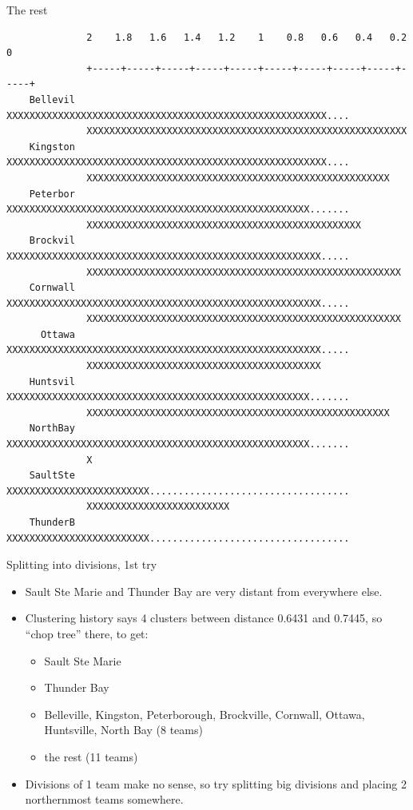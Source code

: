 \documentclass[pdf]{prosper}
\begin{document}
\begin{slide}{The rest}
{\tiny
\begin{verbatim}
              2    1.8   1.6   1.4   1.2    1    0.8   0.6   0.4   0.2    0
              +-----+-----+-----+-----+-----+-----+-----+-----+-----+-----+
    Bellevil  XXXXXXXXXXXXXXXXXXXXXXXXXXXXXXXXXXXXXXXXXXXXXXXXXXXXXXXX....
              XXXXXXXXXXXXXXXXXXXXXXXXXXXXXXXXXXXXXXXXXXXXXXXXXXXXXXXX
    Kingston  XXXXXXXXXXXXXXXXXXXXXXXXXXXXXXXXXXXXXXXXXXXXXXXXXXXXXXXX....
              XXXXXXXXXXXXXXXXXXXXXXXXXXXXXXXXXXXXXXXXXXXXXXXXXXXXX
    Peterbor  XXXXXXXXXXXXXXXXXXXXXXXXXXXXXXXXXXXXXXXXXXXXXXXXXXXXX.......
              XXXXXXXXXXXXXXXXXXXXXXXXXXXXXXXXXXXXXXXXXXXXXXXX
    Brockvil  XXXXXXXXXXXXXXXXXXXXXXXXXXXXXXXXXXXXXXXXXXXXXXXXXXXXXXX.....
              XXXXXXXXXXXXXXXXXXXXXXXXXXXXXXXXXXXXXXXXXXXXXXXXXXXXXXX
    Cornwall  XXXXXXXXXXXXXXXXXXXXXXXXXXXXXXXXXXXXXXXXXXXXXXXXXXXXXXX.....
              XXXXXXXXXXXXXXXXXXXXXXXXXXXXXXXXXXXXXXXXXXXXXXXXXXXXXXX
      Ottawa  XXXXXXXXXXXXXXXXXXXXXXXXXXXXXXXXXXXXXXXXXXXXXXXXXXXXXXX.....
              XXXXXXXXXXXXXXXXXXXXXXXXXXXXXXXXXXXXXXXXX
    Huntsvil  XXXXXXXXXXXXXXXXXXXXXXXXXXXXXXXXXXXXXXXXXXXXXXXXXXXXX.......
              XXXXXXXXXXXXXXXXXXXXXXXXXXXXXXXXXXXXXXXXXXXXXXXXXXXXX
    NorthBay  XXXXXXXXXXXXXXXXXXXXXXXXXXXXXXXXXXXXXXXXXXXXXXXXXXXXX.......
              X
    SaultSte  XXXXXXXXXXXXXXXXXXXXXXXXX...................................
              XXXXXXXXXXXXXXXXXXXXXXXXX
    ThunderB  XXXXXXXXXXXXXXXXXXXXXXXXX...................................

\end{verbatim}
}
  
\end{slide}

\begin{slide}{Splitting into divisions, 1st try}

  \begin{itemize}
  \item Sault Ste Marie and Thunder Bay are very distant from everywhere else.
  \item Clustering history says 4 clusters between distance 0.6431 and 0.7445, so ``chop tree'' there, to get:
    \begin{itemize}
    \item Sault Ste Marie
    \item Thunder Bay
    \item Belleville, Kingston, Peterborough, Brockville, Cornwall, Ottawa, Huntsville, North Bay (8 teams)
    \item the rest (11 teams)
    \end{itemize}
\item Divisions of 1 team make no sense, so try splitting big divisions  and placing 2 northernmost teams somewhere.
  \end{itemize}
  
\end{slide}
\end{document}

